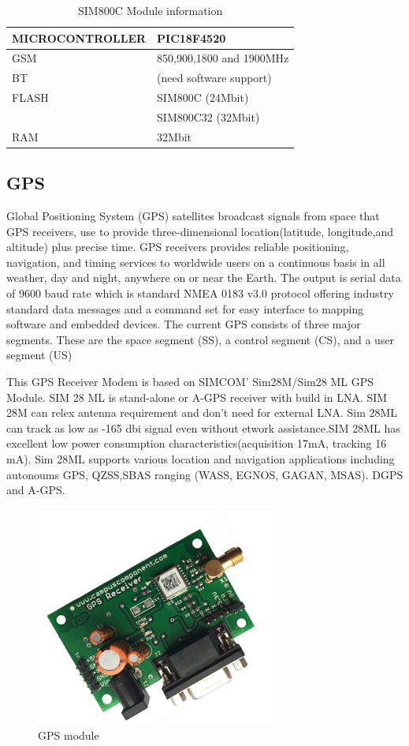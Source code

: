\documentclass[12pt,a4paper,oneside,openright]{report}
\begin{document}
\begin{table}[!h]
\centering
\caption{SIM800C Module information}
 \begin{tabular}{|l|l|}\hline
 \bf MICROCONTROLLER & \bf PIC18F4520 \\ \hline
GSM  	&850,900,1800 and 1900MHz \\ \hline
BT	&(need software support) \\ \hline
FLASH & SIM800C (24Mbit) \\
      &SIM800C32 (32Mbit) \\ \hline
RAM	&32Mbit \\ \hline
 \end{tabular}
\end{table}
\subsection{GPS}
Global Positioning System (GPS) satellites broadcast signals from space that GPS receivers, use to provide three-dimensional location(latitude, longitude,and altitude) plus  precise time. GPS receivers provides reliable positioning, navigation, and timing services to worldwide users on a continuous basis in all weather, day and night, anywhere on or near the Earth. The output is serial data of 9600 baud rate which is standard NMEA 0183 v3.0 protocol offering industry standard data messages and a command set for easy interface to mapping software and embedded devices. The current GPS consists of three major segments. These are the space segment (SS), a control segment (CS), and a user segment (US)

This GPS Receiver Modem is based on SIMCOM' Sim28M/Sim28 ML GPS Module. SIM 28 ML is stand-alone or A-GPS receiver with build in LNA. SIM 28M can relex antenna requirement and don’t need for external LNA. Sim 28ML can track as low as -165 dbi signal even without etwork assistance.SIM 28ML has excellent low power consumption characteristics(acquisition 17mA, tracking 16 mA). Sim 28ML supports various location and navigation applications including autonoums GPS, QZSS,SBAS ranging (WASS, EGNOS, GAGAN, MSAS). DGPS and A-GPS.

\begin{figure}[!h]
 \centering
 \includegraphics[width = .50\textwidth]{Figures/12.jpg}
 \caption{GPS module}
 \label{gps}
\end{figure}
\end{document}
